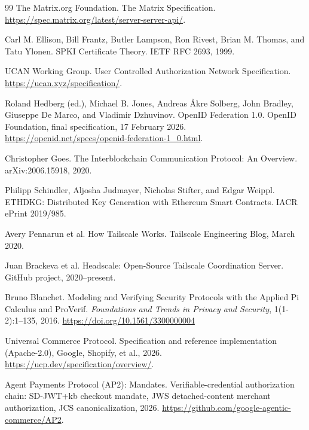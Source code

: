 \documentclass[11pt,a4paper]{article}
\theoremstyle{definition}
\theoremstyle{remark}
\begin{document}
\begin{thebibliography}{99}
The Matrix.org Foundation.
\newblock The Matrix Specification.
\newblock \url{https://spec.matrix.org/latest/server-server-api/}.

Carl M. Ellison, Bill Frantz, Butler Lampson, Ron Rivest, Brian M. Thomas, and Tatu Ylonen.
\newblock SPKI Certificate Theory.
\newblock IETF RFC 2693, 1999.

UCAN Working Group.
\newblock User Controlled Authorization Network Specification.
\newblock \url{https://ucan.xyz/specification/}.

Roland Hedberg (ed.), Michael B. Jones, Andreas Åkre Solberg, John Bradley, Giuseppe De Marco, and Vladimir Dzhuvinov.
\newblock OpenID Federation 1.0.
\newblock OpenID Foundation, final specification, 17 February 2026.
\newblock \url{https://openid.net/specs/openid-federation-1_0.html}.

Christopher Goes.
\newblock The Interblockchain Communication Protocol: An Overview.
\newblock arXiv:2006.15918, 2020.

Philipp Schindler, Aljosha Judmayer, Nicholas Stifter, and Edgar Weippl.
\newblock ETHDKG: Distributed Key Generation with Ethereum Smart Contracts.
\newblock IACR ePrint 2019/985.

Avery Pennarun et al.
\newblock How Tailscale Works.
\newblock Tailscale Engineering Blog, March 2020.

Juan Brackeva et al.
\newblock Headscale: Open-Source Tailscale Coordination Server.
\newblock GitHub project, 2020--present.

Bruno Blanchet.
\newblock Modeling and Verifying Security Protocols with the Applied Pi Calculus and ProVerif.
\newblock \textit{Foundations and Trends in Privacy and Security}, 1(1-2):1--135, 2016.
\newblock \url{https://doi.org/10.1561/3300000004}

Universal Commerce Protocol.
\newblock Specification and reference implementation (Apache-2.0), Google, Shopify, et al., 2026.
\newblock \url{https://ucp.dev/specification/overview/}.

Agent Payments Protocol (AP2): Mandates.
\newblock Verifiable-credential authorization chain: SD-JWT+kb checkout mandate, JWS detached-content merchant authorization, JCS canonicalization, 2026.
\newblock \url{https://github.com/google-agentic-commerce/AP2}.


\end{thebibliography}
\end{document}
